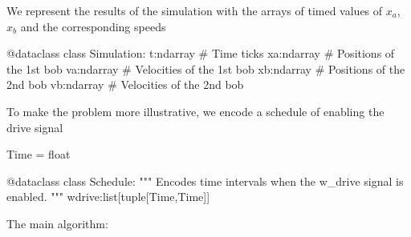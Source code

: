 We represent the results of the simulation with the arrays of timed values of $x_a$, $x_b$ and the
corresponding speeds


  \begin{comment}
    \begin{sh}
    printf '\\begin{%
    cat $PROJECT_ROOT/python/mechanical_bloch.py | sedlines.sh Simulation
    printf '\\end{%
    \end{sh}
  \end{comment}

  \begin{python}
  @dataclass
  class Simulation:
    t:ndarray   # Time ticks
    xa:ndarray  # Positions of the 1st bob
    va:ndarray  # Velocities of the 1st bob
    xb:ndarray  # Positions of the 2nd bob
    vb:ndarray  # Velocities of the 2nd bob
  \end{python}

To make the problem more illustrative, we encode a schedule of enabling the drive signal

  \begin{comment}
    \begin{sh}
    printf '\\begin{%
    cat $PROJECT_ROOT/python/mechanical_bloch.py | sedlines.sh Schedule
    printf '\\end{%
    \end{sh}
  \end{comment}

  \begin{python}
  Time = float

  @dataclass
  class Schedule:
    """ Encodes time intervals when the w_drive signal is enabled. """
    wdrive:list[tuple[Time,Time]]
  \end{python}


The main algorithm:

  \begin{comment}
    \begin{sh}
    printf '\\begin{%
    cat $PROJECT_ROOT/python/mechanical_bloch.py | sedlines.sh coupled_detuned_oscillators
    printf '\\end{%
    \end{sh}
  \end{comment}


